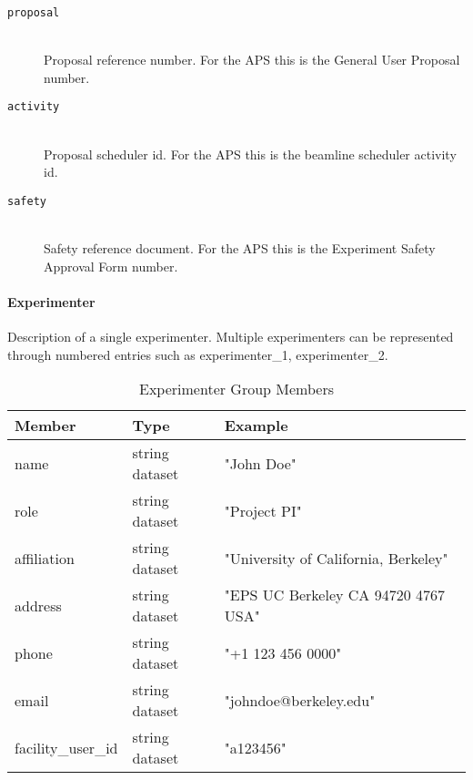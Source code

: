 \begin{description}
\item[\tt {proposal}] \hfill \\
{Proposal reference number. For the APS this is the General User Proposal
number.}

\item[\tt {activity}] \hfill \\
{Proposal scheduler id. For the APS this is the beamline scheduler activity id.}

\item[\tt {safety}] \hfill \\
{Safety reference document. For the APS this is the Experiment Safety Approval
Form number.}
\end{description}

\paragraph{Experimenter}

Description of a single experimenter. Multiple experimenters can be represented
through numbered entries such as experimenter\_1, experimenter\_2.

\begin{table}[h!]\sffamily \footnotesize
\centering
\caption{Experimenter Group Members}
\begin{tabular}{l l l}
\toprule
\bfseries Member     & \bfseries Type & \bfseries Example \\
\midrule
name & string dataset & "John Doe" \\    
role & string dataset & "Project PI"     \\ 
affiliation & string dataset &  "University of California, Berkeley" \\  
address & string dataset & "EPS  UC Berkeley CA  94720 4767 USA" \\  
phone & string dataset & "+1 123 456 0000" \\    
email & string dataset &  "johndoe@berkeley.edu" \\  
facility\_user\_id & string dataset &  "a123456" \\ 
\bottomrule
\end{tabular}
\label{table:experimenter}
\end{table}

